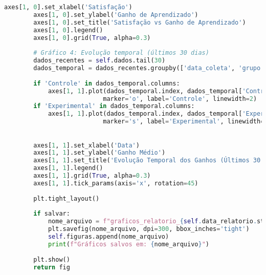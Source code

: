 \begin{pythonbox}
\begin{lstlisting}[language=Python]               
        axes[1, 0].set_xlabel('Satisfação')
        axes[1, 0].set_ylabel('Ganho de Aprendizado')
        axes[1, 0].set_title('Satisfação vs Ganho de Aprendizado')
        axes[1, 0].legend()
        axes[1, 0].grid(True, alpha=0.3)
        
        # Gráfico 4: Evolução temporal (últimos 30 dias)
        dados_recentes = self.dados.tail(30)
        dados_temporal = dados_recentes.groupby(['data_coleta', 'grupo'])['ganho_aprendizado'].mean().unstack()
        
        if 'Controle' in dados_temporal.columns:
            axes[1, 1].plot(dados_temporal.index, dados_temporal['Controle'], 
                           marker='o', label='Controle', linewidth=2)
        if 'Experimental' in dados_temporal.columns:
            axes[1, 1].plot(dados_temporal.index, dados_temporal['Experimental'], 
                           marker='s', label='Experimental', linewidth=2)

  
        axes[1, 1].set_xlabel('Data')
        axes[1, 1].set_ylabel('Ganho Médio')
        axes[1, 1].set_title('Evolução Temporal dos Ganhos (Últimos 30 dias)')
        axes[1, 1].legend()
        axes[1, 1].grid(True, alpha=0.3)
        axes[1, 1].tick_params(axis='x', rotation=45)
        
        plt.tight_layout()
        
        if salvar:
            nome_arquivo = f"graficos_relatorio_{self.data_relatorio.strftime('%Y%m%d_%H%M%S')}.png"
            plt.savefig(nome_arquivo, dpi=300, bbox_inches='tight')
            self.figuras.append(nome_arquivo)
            print(f"Gráficos salvos em: {nome_arquivo}")
        
        plt.show()
        return fig
\end{lstlisting}
\end{pythonbox}

